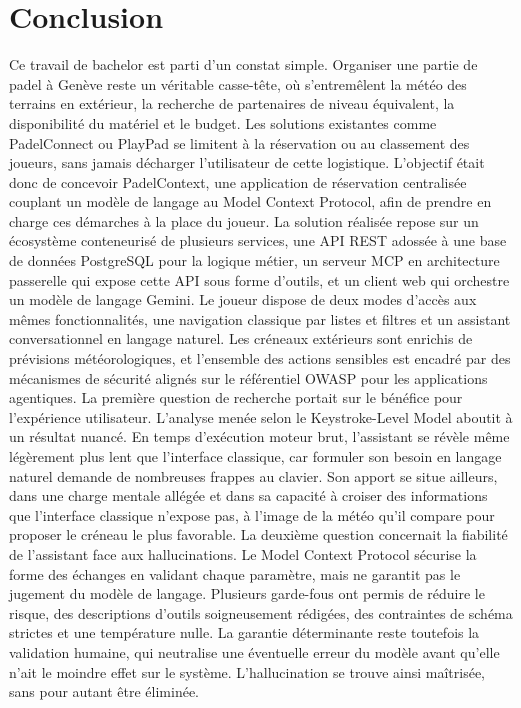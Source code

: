\documentclass[12pt]{article}
\let\stdsection\section
\renewcommand{\section}{\clearpage\stdsection}
\begin{document}
\section{Conclusion}
Ce travail de bachelor est parti d'un constat simple. Organiser une partie de padel à Genève reste un véritable casse-tête, où s'entremêlent la météo des terrains en extérieur, la recherche de partenaires de niveau équivalent, la disponibilité du matériel et le budget. Les solutions existantes comme PadelConnect ou PlayPad se limitent à la réservation ou au classement des joueurs, sans jamais décharger l'utilisateur de cette logistique. L'objectif était donc de concevoir PadelContext, une application de réservation centralisée couplant un modèle de langage au Model Context Protocol, afin de prendre en charge ces démarches à la place du joueur.
\newline\newline
La solution réalisée repose sur un écosystème conteneurisé de plusieurs services, une API REST adossée à une base de données PostgreSQL pour la logique métier, un serveur MCP en architecture passerelle qui expose cette API sous forme d'outils, et un client web qui orchestre un modèle de langage Gemini. Le joueur dispose de deux modes d'accès aux mêmes fonctionnalités, une navigation classique par listes et filtres et un assistant conversationnel en langage naturel. Les créneaux extérieurs sont enrichis de prévisions météorologiques, et l'ensemble des actions sensibles est encadré par des mécanismes de sécurité alignés sur le référentiel OWASP pour les applications agentiques.
\newline\newline
La première question de recherche portait sur le bénéfice pour l'expérience utilisateur. L'analyse menée selon le Keystroke-Level Model aboutit à un résultat nuancé. En temps d'exécution moteur brut, l'assistant se révèle même légèrement plus lent que l'interface classique, car formuler son besoin en langage naturel demande de nombreuses frappes au clavier. Son apport se situe ailleurs, dans une charge mentale allégée et dans sa capacité à croiser des informations que l'interface classique n'expose pas, à l'image de la météo qu'il compare pour proposer le créneau le plus favorable.
\newline\newline
La deuxième question concernait la fiabilité de l'assistant face aux hallucinations. Le Model Context Protocol sécurise la forme des échanges en validant chaque paramètre, mais ne garantit pas le jugement du modèle de langage. Plusieurs garde-fous ont permis de réduire le risque, des descriptions d'outils soigneusement rédigées, des contraintes de schéma strictes et une température nulle. La garantie déterminante reste toutefois la validation humaine, qui neutralise une éventuelle erreur du modèle avant qu'elle n'ait le moindre effet sur le système. L'hallucination se trouve ainsi maîtrisée, sans pour autant être éliminée.
\end{document}

